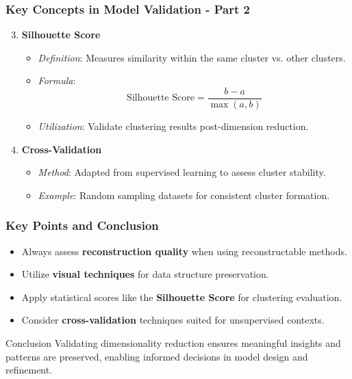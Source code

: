 \documentclass[aspectratio=169]{beamer}
\begin{document}
\begin{frame}[fragile]
    \frametitle{Key Concepts in Model Validation - Part 2}
    \begin{enumerate}
        \setcounter{enumi}{2}
        \item \textbf{Silhouette Score}
        \begin{itemize}
            \item \textit{Definition}: Measures similarity within the same cluster vs. other clusters.
            \item \textit{Formula}:
            \begin{equation}
            \text{Silhouette Score} = \frac{b - a}{\max(a, b)}
            \end{equation}
            \item \textit{Utilization}: Validate clustering results post-dimension reduction.
        \end{itemize}

        \item \textbf{Cross-Validation}
        \begin{itemize}
            \item \textit{Method}: Adapted from supervised learning to assess cluster stability.
            \item \textit{Example}: Random sampling datasets for consistent cluster formation.
        \end{itemize}
    \end{enumerate}
\end{frame}

\begin{frame}[fragile]
    \frametitle{Key Points and Conclusion}
    \begin{itemize}
        \item Always assess \textbf{reconstruction quality} when using reconstructable methods.
        \item Utilize \textbf{visual techniques} for data structure preservation.
        \item Apply statistical scores like the \textbf{Silhouette Score} for clustering evaluation.
        \item Consider \textbf{cross-validation} techniques suited for unsupervised contexts.
    \end{itemize}
    \begin{block}{Conclusion}
        Validating dimensionality reduction ensures meaningful insights and patterns are preserved, enabling informed decisions in model design and refinement.
    \end{block}
\end{frame}
\end{document}
